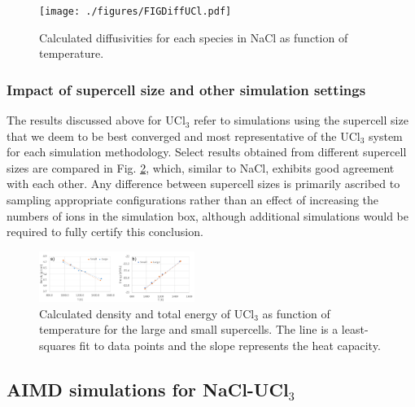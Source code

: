 \documentclass[preprint,3p,10pt,twocolumn,number,sort&compress]{elsarticle}
\begin{document}
\begin{figure}[htb]
\centering
\texttt{[image: ./figures/FIGDiffUCl.pdf]}
\caption{Calculated diffusivities for each species in NaCl as function of temperature.} 
\label{fig:diffNaCl}
\end{figure}

\subsubsection{Impact of supercell size and other simulation settings}
The results discussed above for UCl$_3$ refer to simulations using the supercell size that we deem to be best converged and most representative of the UCl$_3$ system for each simulation methodology. Select results obtained from different supercell sizes are compared in Fig. \ref{fig:UCl3size}, which, similar to NaCl, exhibits good agreement with each other.  Any difference between supercell sizes is primarily ascribed to sampling appropriate configurations rather than an effect of increasing the numbers of ions in the simulation box, although additional simulations would be required to fully certify this conclusion. 

\begin{figure}[htb]
\centering
\includegraphics[width=0.45\textwidth]{./figures/FIG4b.pdf}
\caption{Calculated density and total energy of UCl$_3$ as function of temperature for the large and small supercells. The line is a least-squares fit to data points and the slope represents the heat capacity.} 
\label{fig:UCl3size}
\end{figure}

 
\subsection{AIMD simulations for NaCl-UCl$_3$}
\end{document}
